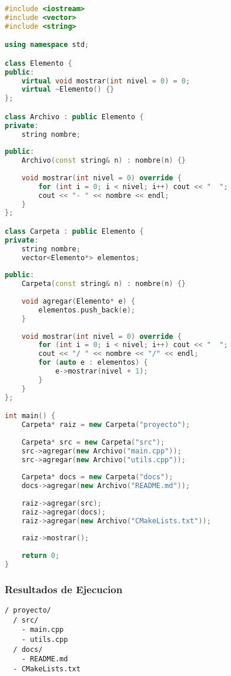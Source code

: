 \documentclass[11pt,a4paper]{article}
\begin{document}
\begin{lstlisting}[language=C++, caption=Sistema de Archivos con Composite]
#include <iostream>
#include <vector>
#include <string>

using namespace std;

class Elemento {
public:
    virtual void mostrar(int nivel = 0) = 0;
    virtual ~Elemento() {}
};

class Archivo : public Elemento {
private:
    string nombre;
    
public:
    Archivo(const string& n) : nombre(n) {}
    
    void mostrar(int nivel = 0) override {
        for (int i = 0; i < nivel; i++) cout << "  ";
        cout << "- " << nombre << endl;
    }
};

class Carpeta : public Elemento {
private:
    string nombre;
    vector<Elemento*> elementos;
    
public:
    Carpeta(const string& n) : nombre(n) {}
    
    void agregar(Elemento* e) {
        elementos.push_back(e);
    }
    
    void mostrar(int nivel = 0) override {
        for (int i = 0; i < nivel; i++) cout << "  ";
        cout << "/ " << nombre << "/" << endl;
        for (auto e : elementos) {
            e->mostrar(nivel + 1);
        }
    }
};

int main() {
    Carpeta* raiz = new Carpeta("proyecto");
    
    Carpeta* src = new Carpeta("src");
    src->agregar(new Archivo("main.cpp"));
    src->agregar(new Archivo("utils.cpp"));
    
    Carpeta* docs = new Carpeta("docs");
    docs->agregar(new Archivo("README.md"));
    
    raiz->agregar(src);
    raiz->agregar(docs);
    raiz->agregar(new Archivo("CMakeLists.txt"));
    
    raiz->mostrar();
    
    return 0;
}
\end{lstlisting}

\subsubsection{Resultados de Ejecucion}

\begin{verbatim}
/ proyecto/
  / src/
    - main.cpp
    - utils.cpp
  / docs/
    - README.md
  - CMakeLists.txt
\end{verbatim}
\end{document}
